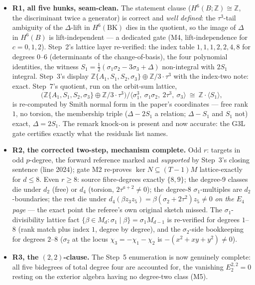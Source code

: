 \documentclass[11pt,a4paper]{article}
\newcommand{\Z}{\mathbb{Z}}
\newcommand{\BK}{\mathrm{BK}}
\begin{document}
\begin{itemize}[leftmargin=1.4em,itemsep=3pt]

\item \textbf{R1, all five hunks, seam-clean.} The statement clause
($H^6(B;\Z)\cong\Z$, the discriminant twice a generator) is correct and
\emph{well defined}: the $\tau^3$-tail ambiguity of the $\Delta$-lift in
$H^6(\BK)$ dies in the quotient, so the image of $\Delta$ in $H^6(B)$ is
lift-independent --- a dedicated gate (M4, lift-independence for
$c=0,1,2$). Step~2's lattice layer re-verified: the index table
$1,1,1,2,2,4,8$ for degrees $0$--$6$ (determinants of the change-of-basis),
the four polynomial identities, the witness $S_1=\tfrac12(\sigma_1\sigma_2
-3\sigma_3+\Delta)$ non-integral with $2S_1$ integral. Step~3's display
$\Z\{A_1,S_1,S_2,\sigma_3\}\oplus\Z/3\cdot\tau^3$ with the index-two note:
exact. Step~7's quotient, run on the orbit-sum lattice,
\[
\bigl(\Z\{A_1,S_1,S_2,\sigma_3\}\oplus\Z/3\cdot\tau^3\bigr)\big/
\langle\sigma_1^3,\ \sigma_1\sigma_2,\ 2\tau^3,\ \sigma_3\rangle
\ \cong\ \Z\cdot\langle S_1\rangle,
\]
is re-computed by Smith normal form in the paper's coordinates --- free
rank $1$, no torsion, the membership triple ($\Delta-2S_1$ a relation;
$\Delta-S_1$ and $S_1$ not) exact, $\Delta=2S_1$. The remark knock-on is
present and now accurate: the G3L gate certifies exactly what the residuals
list names.

\item \textbf{R2, the corrected two-step, mechanism complete.} Odd $r$:
targets in odd $p$-degree, the forward reference marked and \emph{supported}
by Step~3's closing sentence (line 2024); gate M2 re-proves
$\ker N\subseteq(T-1)M$ lattice-exactly for $d\le 8$. Even $r\ge 8$:
source fibre-degrees exactly $\{8,9\}$; the degree-9 classes die under
$d_2$ (free) or $d_4$ (torsion, $2\tau^{a+2}\ne 0$); the degree-8
$\sigma_1$-multiples are $d_2$-boundaries; the rest die under
$d_4(\beta z_3z_5)=\beta(\sigma_2+2\tau^2)z_5\ne 0$ \emph{on the $E_4$
page} --- the exact point the referee's own original sketch missed. The
$\sigma_1$-divisibility lattice fact
$\{\beta\in M_d:\sigma_1\mid\beta\}=\sigma_1 M_{d-1}$ is re-verified for
degrees $1$--$8$ (rank match plus index $1$, degree by degree), and the
$\sigma_2$-side bookkeeping for degrees $2$--$8$ ($\sigma_2$ at the locus
$\chi_3=-\chi_1-\chi_2$ is $-(x^2+xy+y^2)\ne 0$).

\item \textbf{R3, the $(2,2)$-clause.} The Step~5 enumeration is now
genuinely complete: all five bidegrees of total degree four are accounted
for, the vanishing $E_2^{2,2}=0$ resting on the exterior algebra having no
degree-two class (M5).


\end{itemize}
\end{document}
